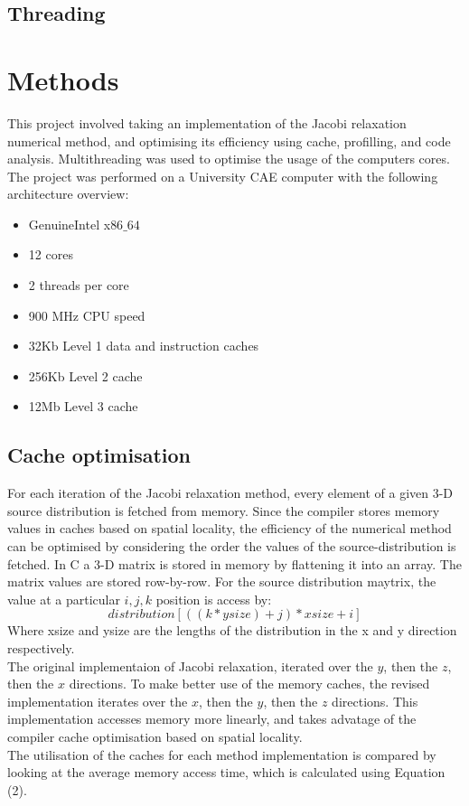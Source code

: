 \documentclass[a4paper, 12pt]{article}
\begin{document}
\subsection{Threading}


\section{Methods}
	This project involved taking an implementation of the Jacobi relaxation numerical method, and optimising its efficiency using cache, profilling, and code analysis. Multithreading was used to optimise the usage of the computers cores. 
	\\
	The project was performed on a University CAE computer with the following architecture overview:
	\begin{itemize}
		\item GenuineIntel x$86\_64$
		\item 12 cores
		\item 2 threads per core
		\item 900 MHz CPU speed
		\item 32Kb Level 1 data and instruction caches
		\item 256Kb Level 2 cache
		\item 12Mb Level 3 cache
	\end{itemize}
	

\subsection{Cache optimisation}
For each iteration of the Jacobi relaxation method, every element of a given 3-D source distribution is fetched from memory. Since the compiler stores memory values in caches based on spatial locality, the efficiency of the numerical method can be optimised by considering the order the values of the source-distribution is fetched. In C a 3-D matrix is stored in memory by flattening it into an array. The matrix values are stored row-by-row. For the source distribution maytrix, the value at a particular $i, j, k$ position is access by:
%
\begin{equation}
distribution[((k*ysize) + j)*xsize + i]
\end{equation}
%
Where xsize and ysize are the lengths of the distribution in the x and y direction respectively.
\\
The original implementaion of Jacobi relaxation, iterated over the $y$, then the $z$, then the $x$ directions. To make better use of the memory caches, the revised implementation iterates over the $x$, then the $y$, then the $z$ directions. This implementation accesses memory more linearly, and takes advatage of the compiler cache optimisation based on spatial locality. 
\\
The utilisation of the caches for each method implementation is compared by looking at the average memory access time, which is calculated using Equation (2). 
%
\end{document}
